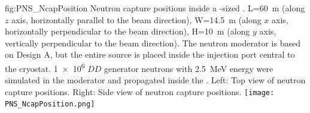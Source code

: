 \begin{dunefigure}{fig:PNS_NcapPosition}
{Neutron capture positions inside a -sized . L=\SI{60}{\m} (along $z$ axis, horizontally parallel to the beam direction), W=\SI{14.5}{\m} (along $x$ axis, horizontally perpendicular to the beam direction), H=\SI{10}{\m} (along $y$ axis, vertically perpendicular to the beam direction). The neutron moderator is based on Design A, but the entire source is placed inside the injection port central to the cryostat. \num{1e6} $DD$ generator neutrons with \SI{2.5}{\MeV} energy were simulated in the moderator and propagated inside the . Left: Top view of neutron capture positions. Right: Side view of neutron capture positions.}
\texttt{[image: PNS\_NcapPosition.png]}
\end{dunefigure}


